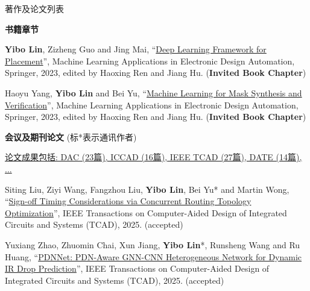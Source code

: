 \begin{rSection}{著作及论文列表}



\textbf{书籍章节}
        

\begin{description}[font=\normalfont, rightmargin=2em]
    

\item[{[B3]}]{
        \textbf{Yibo Lin}, Zizheng Guo and Jing Mai, 
    ``\href{https://doi.org/10.1007/978-3-031-13074-8}{Deep Learning Framework for Placement}'', 
    Machine Learning Applications in Electronic Design Automation, Springer, 2023, edited by Haoxing Ren and Jiang Hu.
    (\textbf{Invited Book Chapter})
}
            

\item[{[B2]}]{
        Haoyu Yang, \textbf{Yibo Lin} and Bei Yu, 
    ``\href{https://doi.org/10.1007/978-3-031-13074-8}{Machine Learning for Mask Synthesis and Verification}'', 
    Machine Learning Applications in Electronic Design Automation, Springer, 2023, edited by Haoxing Ren and Jiang Hu.
    (\textbf{Invited Book Chapter})
}
            

\end{description}
    

\textbf{会议及期刊论文} (标*表示通讯作者)
        

            \underline{论文成果包括: DAC (23篇), ICCAD (16篇), IEEE TCAD (27篇), DATE (14篇), ...} 
    

\begin{description}[font=\normalfont, rightmargin=2em]
    

\item[{[J176]}]{
        Siting Liu, Ziyi Wang, Fangzhou Liu, \textbf{Yibo Lin}, Bei Yu* and Martin Wong, 
    ``\href{https://doi.org/10.1109/TCAD.2024.3506216}{Sign-off Timing Considerations via Concurrent Routing Topology Optimization}'', 
    IEEE Transactions on Computer-Aided Design of Integrated Circuits and Systems (TCAD), 2025.
    (accepted)
}
            

\item[{[J175]}]{
        Yuxiang Zhao, Zhuomin Chai, Xun Jiang, \textbf{Yibo Lin}*, Runsheng Wang and Ru Huang, 
    ``\href{https://doi.org/10.1109/TCAD.2024.3509796}{PDNNet: PDN-Aware GNN-CNN Heterogeneous Network for Dynamic IR Drop Prediction}'', 
    IEEE Transactions on Computer-Aided Design of Integrated Circuits and Systems (TCAD), 2025.
    (accepted)
}
            


\end{description}
\end{rSection}
